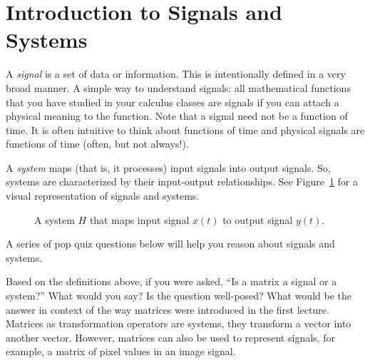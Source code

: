 
\section{Introduction to Signals and Systems}
A \emph{signal} is a set of data or information. This is intentionally defined in a very broad manner. A simple way to understand signals: all mathematical functions that you have studied in your calculus classes are signals if you can attach a physical meaning to the function. Note that a signal need not be a function of time. It is often intuitive to think about functions of time and physical signals are functions of time (often, but not always!).

A \emph{system} maps (that is, it processes) input signals into output signals. So, systems are characterized by their input-output relationships. See Figure~\ref{fig:system} for a visual representation of signals and systems.
\begin{figure}[h]
  \centering
{} 
 \caption{A system $H$ that maps input signal $x(t)$ to output signal $y(t)$.}
  \label{fig:system}
\end{figure}
A series of pop quiz questions below will help you reason about signals and systems.
\begin{popquiz}
Based on the definitions above, if you were asked, ``Is a matrix a signal or a system?'' What would you say? Is the question well-posed? What would be the answer in context of the way matrices were introduced in the first lecture.
\popqsplit 
Matrices as transformation operators are systems, they transform a vector into another vector. However, matrices can also be used to represent signals, for example, a matrix of pixel values in an image signal. 
\end{popquiz}


